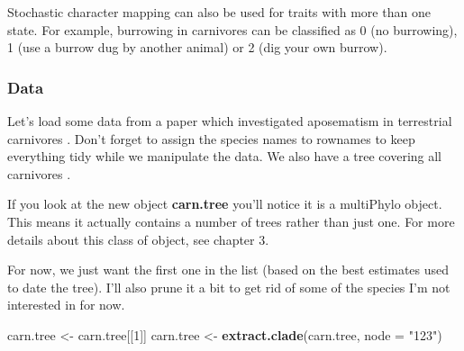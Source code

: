 \documentclass[
]{book}
\newenvironment{Shaded}{\begin{snugshade}}{\end{snugshade}}
\newcommand{\DataTypeTok}[1]{\textcolor[rgb]{0.13,0.29,0.53}{#1}}
\newcommand{\DecValTok}[1]{\textcolor[rgb]{0.00,0.00,0.81}{#1}}
\newcommand{\KeywordTok}[1]{\textcolor[rgb]{0.13,0.29,0.53}{\textbf{#1}}}
\newcommand{\NormalTok}[1]{#1}
\newcommand{\OperatorTok}[1]{\textcolor[rgb]{0.81,0.36,0.00}{\textbf{#1}}}
\newcommand{\StringTok}[1]{\textcolor[rgb]{0.31,0.60,0.02}{#1}}
\begin{document}
Stochastic character mapping can also be used for traits with more than one state. For example, burrowing in carnivores can be classified as 0 (no burrowing), 1 (use a burrow dug by another animal) or 2 (dig your own burrow).

\hypertarget{data-1}{%
\subsubsection{Data}\label{data-1}}

Let's load some data from a paper which investigated aposematism in terrestrial carnivores \citep{Stankowich11}. Don't forget to assign the species names to rownames to keep everything tidy while we manipulate the data. We also have a tree covering all carnivores \citep{Nyakatura12}.

\begin{Shaded}
\end{Shaded}

If you look at the new object \textbf{carn.tree} you'll notice it is a multiPhylo object. This means it actually contains a number of trees rather than just one. For more details about this class of object, see chapter 3.

For now, we just want the first one in the list (based on the best estimates used to date the tree). I'll also prune it a bit to get rid of some of the species I'm not interested in for now.

\begin{Shaded}
\begin{Highlighting}[]
\NormalTok{carn.tree \textless{}{-}}\StringTok{ }\NormalTok{carn.tree[[}\DecValTok{1}\NormalTok{]]}
\NormalTok{carn.tree \textless{}{-}}\StringTok{ }\KeywordTok{extract.clade}\NormalTok{(carn.tree, }\DataTypeTok{node =} \StringTok{"\textquotesingle{}123\textquotesingle{}"}\NormalTok{)}
\end{Highlighting}
\end{Shaded}
\end{document}
